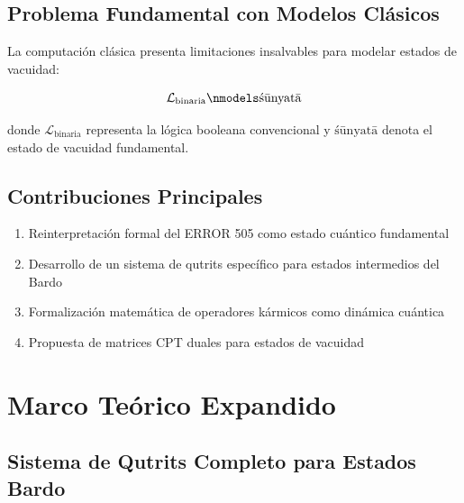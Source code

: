 \documentclass[12pt,a4paper]{article}
\theoremstyle{definition}
\begin{document}
\subsection{Problema Fundamental con Modelos Clásicos}
La computación clásica presenta limitaciones insalvables para modelar estados de vacuidad:

\begin{equation}
    \mathcal{L}_{\text{binaria}} \nmodels \text{śūnyatā}
\end{equation}

donde $\mathcal{L}_{\text{binaria}}$ representa la lógica booleana convencional y $\text{śūnyatā}$ denota el estado de vacuidad fundamental.

\subsection{Contribuciones Principales}
\begin{enumerate}
    \item Reinterpretación formal del ERROR 505 como estado cuántico fundamental
    \item Desarrollo de un sistema de qutrits específico para estados intermedios del Bardo
    \item Formalización matemática de operadores kármicos como dinámica cuántica
    \item Propuesta de matrices CPT duales para estados de vacuidad
\end{enumerate}

\section{Marco Teórico Expandido}

\subsection{Sistema de Qutrits Completo para Estados Bardo}
\end{document}
